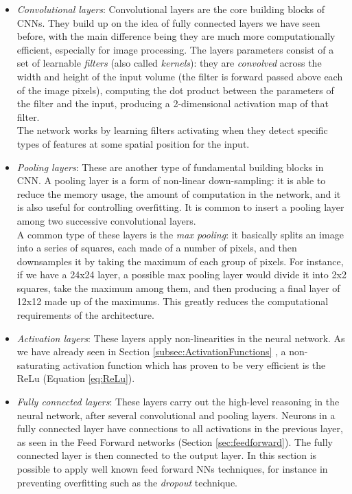 \begin{itemize}
	\item \textit{Convolutional layers}: Convolutional layers are the core building blocks of CNNs. They build up on the idea of fully connected layers we have seen before, with the main difference being they are much more computationally efficient, especially for image processing. The layers parameters consist of a set of learnable \textit{filters} (also called \textit{kernels}): they are \textit{convolved} across the width and height of the input volume (the filter is forward passed above each of the image pixels), computing the dot product between the parameters of the filter and the input, producing a 2-dimensional activation map of that filter. 
	\\
	\indent The network works by learning filters activating when they detect specific types of features at some spatial position for the input.
	\item \textit{Pooling layers}: These are another type of fundamental building blocks in CNN. A pooling layer is a form of non-linear down-sampling: it is able to reduce the memory usage, the amount of computation in the network, and it is also useful for controlling overfitting. It is common to insert a pooling layer among two successive convolutional layers. 
	\\
	\indent A common type of these layers is the \textit{max pooling}: it basically splits an image into a series of squares, each made of a number of pixels, and then downsamples it by taking the maximum of each group of pixels. For instance, if we have a 24x24 layer, a possible max pooling layer would divide it into 2x2 squares, take the maximum among them, and then producing a final layer of 12x12 made up of the maximums. This greatly reduces the computational requirements of the architecture.
	
	\item \textit{Activation layers}: These layers apply non-linearities in the neural network. As we have already seen in Section \ref{subsec:ActivationFunctions} , a non-saturating activation function which has proven to be very efficient is the ReLu\cite{nair2010rectified} (Equation \ref{eq:ReLu}).
	 
	\item  \textit{Fully connected layers}: These layers carry out the high-level reasoning in the neural network, after several convolutional and pooling layers. Neurons in a fully connected layer have connections to all activations in the previous layer, as seen in the Feed Forward networks (Section \ref{sec:feedforward}). The fully connected layer is then connected to the output layer. In this section is possible to apply well known feed forward NNs techniques, for instance in preventing overfitting such as the \textit{dropout}\cite{srivastava2014dropout} technique.
\end{itemize}

